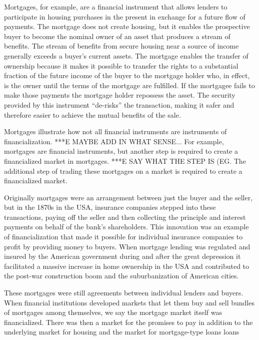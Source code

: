
Mortgages, for example, are a financial instrument that allows lenders to  participate in housing purchases in the present in exchange for a future flow of payments.  The mortgage does not create housing, but it enables the prospective buyer to become the nominal owner of an asset that produces a stream of benefits. The stream of benefits from secure housing near a source of income generally exceeds a buyer's current assets. The mortgage enables the transfer of ownership because it makes it possible to transfer the rights to a substantial fraction of the future income of the buyer to the mortgage holder who, in effect, is the owner until the terms of the mortgage are fulfilled.  If the mortgagee fails to make those payments the mortgage holder repossess the asset. The security provided by this instrument ``de-risks'' the transaction, making it safer and therefore easier to achieve the mutual benefits of the sale.

Mortgages illustrate how not all financial instruments are instruments of financialization. ***E MAYBE ADD IN WHAT SENSE... %
For example, mortgages are  financial instruments, but another step is required to create a financialized  market in mortgages. ***E SAY WHAT THE STEP IS (EG. The additional step of trading these mortgages on a market is required to create a financialized market. 

Originally mortgages were an arrangement between just the buyer and the seller, but in the 1870s in the USA, insurance companies stepped into these transactions, paying off the seller and then collecting the principle and interest payments on behalf of the bank's shareholders. This innovation was an example of financialization that made it possible for individual insurance companies to profit by providing money to buyers. When mortgage lending was regulated and insured  by the American government during and after the great depression it facilitated a massive increase in home ownership in the USA and contributed to the post-war construction boom and the suburbanization of American cities. 

These mortgages were still agreements between individual lenders and buyers. When financial institutions developed markets that let them buy and sell bundles of mortgages among themselves, we say the mortgage market itself was financialized. There was then a market for the  promises to pay in addition to the underlying market for housing and the market for mortgage-type loans loans


